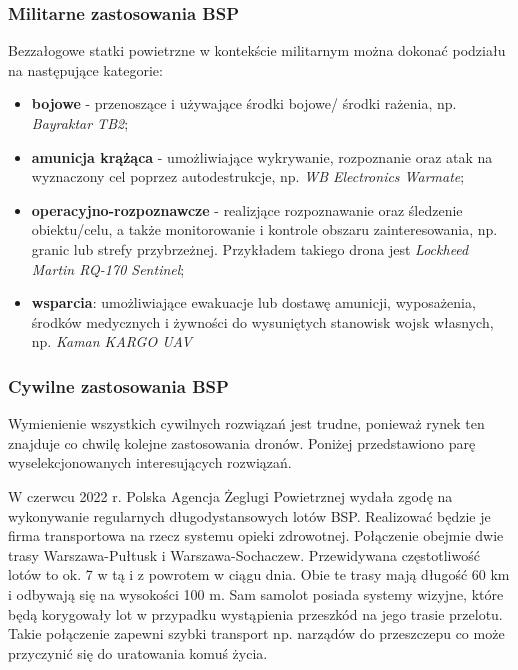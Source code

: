 \subsubsection{Militarne zastosowania BSP}
Bezzałogowe statki powietrzne w kontekście militarnym można dokonać podziału na następujące kategorie: 
\begin{itemize}
  \item \textbf{bojowe} - przenoszące i używające środki bojowe/ środki rażenia, np. \textit{Bayraktar TB2};
  \item \textbf{amunicja krążąca} - umożliwiające wykrywanie, rozpoznanie oraz atak na wyznaczony cel poprzez autodestrukcje, np. \textit{WB Electronics Warmate};
  \item \textbf{operacyjno-rozpoznawcze} - realizjące rozpoznawanie oraz śledzenie \\obiektu/celu, a także monitorowanie i kontrole obszaru zainteresowania, np. granic lub strefy przybrzeżnej. Przykładem takiego drona jest \textit{Lockheed Martin RQ-170 Sentinel};
  \item \textbf{wsparcia}: umożliwiające ewakuacje lub dostawę amunicji, wyposażenia, środków medycznych i żywności do wysuniętych stanowisk wojsk własnych, np. \textit{Kaman KARGO UAV} \cite{konkurs-mon}
\end{itemize}

\subsubsection{Cywilne zastosowania BSP}
Wymienienie wszystkich cywilnych rozwiązań jest trudne, ponieważ rynek ten znajduje co chwilę kolejne zastosowania dronów. Poniżej przedstawiono parę wyselekcjonowanych interesujących rozwiązań.

W czerwcu 2022 r. Polska Agencja Żeglugi Powietrznej wydała zgodę na wykonywanie regularnych długodystansowych lotów BSP. Realizować będzie je firma transportowa na rzecz systemu opieki zdrowotnej. Połączenie obejmie dwie trasy Warszawa-Pułtusk i Warszawa-Sochaczew. Przewidywana częstotliwość lotów to ok. 7 w tą i z powrotem w ciągu dnia. Obie te trasy mają długość 60 km i odbywają się na wysokości 100 m. Sam samolot posiada systemy wizyjne, które będą korygowały lot w przypadku wystąpienia przeszkód na jego trasie przelotu. Takie połączenie zapewni szybki transport np. narządów do przeszczepu co może przyczynić się do uratowania komuś życia. \cite{pansa-lot-medyczny}

